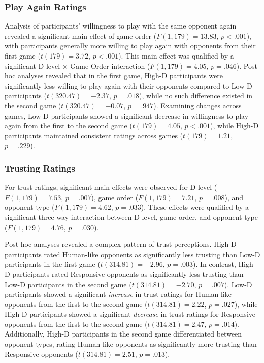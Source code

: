 \documentclass[
]{article}
\begin{document}
\subsubsection{Play Again Ratings}\label{play-again-ratings}

Analysis of participants' willingness to play with the same opponent again revealed a significant main effect of game order (\(F(1, 179) = 13.83\), \(p < .001\)), with participants generally more willing to play again with opponents from their first game (\(t(179) = 3.72\), \(p < .001\)). This main effect was qualified by a significant D-level × Game Order interaction (\(F(1, 179) = 4.05\), \(p = .046\)). Post-hoc analyses revealed that in the first game, High-D participants were significantly less willing to play again with their opponents compared to Low-D participants (\(t(320.47) = -2.37\), \(p = .018\)), while no such difference existed in the second game (\(t(320.47) = -0.07\), \(p = .947\)). Examining changes across games, Low-D participants showed a significant decrease in willingness to play again from the first to the second game (\(t(179) = 4.05\), \(p < .001\)), while High-D participants maintained consistent ratings across games (\(t(179) = 1.21\), \(p = .229\)).

\subsubsection{Trusting Ratings}\label{trusting-ratings}

For trust ratings, significant main effects were observed for D-level (\(F(1, 179) = 7.53\), \(p = .007\)), game order (\(F(1, 179) = 7.21\), \(p = .008\)), and opponent type (\(F(1, 179) = 4.62\), \(p = .033\)). These effects were qualified by a significant three-way interaction between D-level, game order, and opponent type (\(F(1, 179) = 4.76\), \(p = .030\)).

Post-hoc analyses revealed a complex pattern of trust perceptions. High-D participants rated Human-like opponents as significantly less trusting than Low-D participants in the first game (\(t(314.81) = -2.96\), \(p = .003\)). In contrast, High-D participants rated Responsive opponents as significantly less trusting than Low-D participants in the second game (\(t(314.81) = -2.70\), \(p = .007\)). Low-D participants showed a significant \emph{increase} in trust ratings for Human-like opponents from the first to the second game (\(t(314.81) = 2.22\), \(p = .027\)), while High-D participants showed a significant \emph{decrease} in trust ratings for Responsive opponents from the first to the second game (\(t(314.81) = 2.47\), \(p = .014\)). Additionally, High-D participants in the second game differentiated between opponent types, rating Human-like opponents as significantly more trusting than Responsive opponents (\(t(314.81) = 2.51\), \(p = .013\)).
\end{document}

